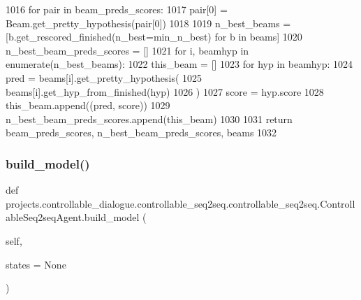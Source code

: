 \begin{DoxyCode}
1016         \textcolor{keywordflow}{for} pair \textcolor{keywordflow}{in} beam\_preds\_scores:
1017             pair[0] = Beam.get\_pretty\_hypothesis(pair[0])
1018 
1019         n\_best\_beams = [b.get\_rescored\_finished(n\_best=min\_n\_best) \textcolor{keywordflow}{for} b \textcolor{keywordflow}{in} beams]
1020         n\_best\_beam\_preds\_scores = []
1021         \textcolor{keywordflow}{for} i, beamhyp \textcolor{keywordflow}{in} enumerate(n\_best\_beams):
1022             this\_beam = []
1023             \textcolor{keywordflow}{for} hyp \textcolor{keywordflow}{in} beamhyp:
1024                 pred = beams[i].get\_pretty\_hypothesis(
1025                     beams[i].get\_hyp\_from\_finished(hyp)
1026                 )
1027                 score = hyp.score
1028                 this\_beam.append((pred, score))
1029             n\_best\_beam\_preds\_scores.append(this\_beam)
1030 
1031         \textcolor{keywordflow}{return} beam\_preds\_scores, n\_best\_beam\_preds\_scores, beams
1032 
\end{DoxyCode}
\mbox{\label{classprojects_1_1controllable__dialogue_1_1controllable__seq2seq_1_1controllable__seq2seq_1_1ControllableSeq2seqAgent_a4cecd20886ef127bbab1a756bb49fb75}} 
\subsubsection{\texorpdfstring{build\+\_\+model()}{build\_model()}}
{\footnotesize\ttfamily def projects.\+controllable\+\_\+dialogue.\+controllable\+\_\+seq2seq.\+controllable\+\_\+seq2seq.\+Controllable\+Seq2seq\+Agent.\+build\+\_\+model (\begin{DoxyParamCaption}\item[{}]{self,  }\item[{}]{states = {\ttfamily None} }\end{DoxyParamCaption})}

